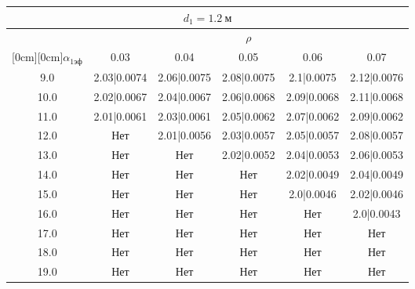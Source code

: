 \documentclass[20pt]{article}
\begin{document}
\begin{center}
\begin{tabular}{c|ccccc}
\hline
	\multicolumn{6}{c}{$d_{1}=1.2 \ м$} \\
\hline
	 & \multicolumn{5}{|c}{$\rho$} \\
	\cline{2-6}
	\raisebox{1.5ex}[0cm][0cm]{$\alpha_{1эф}$} & 0.03 & 0.04 & 0.05 & 0.06 & 0.07\\
\hline
	9.0 & 	2.03|0.0074 & 	2.06|0.0075 & 	2.08|0.0075 & 	2.1|0.0075 & 	2.12|0.0076\\
	10.0 & 	2.02|0.0067 & 	2.04|0.0067 & 	2.06|0.0068 & 	2.09|0.0068 & 	2.11|0.0068\\
	11.0 & 	2.01|0.0061 & 	2.03|0.0061 & 	2.05|0.0062 & 	2.07|0.0062 & 	2.09|0.0062\\
	12.0 & 	Нет & 	2.01|0.0056 & 	2.03|0.0057 & 	2.05|0.0057 & 	2.08|0.0057\\
	13.0 & 	Нет & 	Нет & 	2.02|0.0052 & 	2.04|0.0053 & 	2.06|0.0053\\
	14.0 & 	Нет & 	Нет & 	Нет & 	2.02|0.0049 & 	2.04|0.0049\\
	15.0 & 	Нет & 	Нет & 	Нет & 	2.0|0.0046 & 	2.02|0.0046\\
	16.0 & 	Нет & 	Нет & 	Нет & 	Нет & 	2.0|0.0043\\
	17.0 & 	Нет & 	Нет & 	Нет & 	Нет & 	Нет\\
	18.0 & 	Нет & 	Нет & 	Нет & 	Нет & 	Нет\\
	19.0 & 	Нет & 	Нет & 	Нет & 	Нет & 	Нет\\
\end{tabular}

\end{center}
\end{document}
